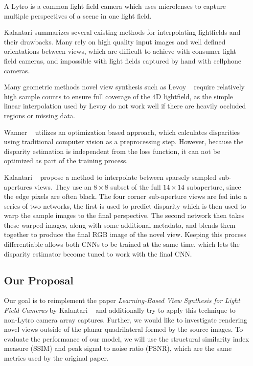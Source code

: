 \documentclass[10pt,twocolumn,letterpaper]{article}
\begin{document}
A Lytro is a common light field camera which uses microlenses to capture multiple
perspectives of a scene in one light field. 

Kalantari summarizes several existing methods for interpolating lightfields and their drawbacks.
Many rely on high quality input images and well defined orientations between views,
which are difficult to achieve with consumer light field cameras, and impossible with light fields
captured by hand with cellphone cameras.

Many geometric methods novel view synthesis 
such as Levoy \etal~\cite{levoy1996light} require relatively high sample counts to ensure full
coverage of the 4D lightfield, as the simple linear interpolation used by Levoy
do not work well if there are heavily occluded regions or missing data.

Wanner \etal~\cite{Wanner} utilizes an optimization based approach, which calculates disparities
using traditional computer vision as a preprocessing step. However, because the disparity estimation
is independent from the loss function, it can not be optimized as part of the training process. 

Kalantari \etal~\cite{LearningViewSynthesis} propose a method to interpolate between 
sparsely sampled sub-apertures views. They use an $8 \times 8$ subset of the full $14 \times 14$ subaperture, since the
edge pixels are often black. The four corner sub-aperture views are fed into a series of two 
networks, the first is used to predict disparity which is then used to warp the sample images to the final perspective.
The second network then takes these warped images, along with some additional metadata, and blends them together
to produce the final RGB image of the novel view. Keeping this process differentiable allows both CNNs to 
be trained at the same time, which lets the disparity estimator become tuned to work with the final CNN.

\subsection{Our Proposal}

Our goal is to reimplement the paper \textit{Learning-Based View Synthesis for Light Field Cameras} by 
Kalantari \etal~\cite{LearningViewSynthesis} and additionally try to apply this technique to non-Lytro camera
array captures. Further, we would like to investigate rendering novel views outside of the planar
quadrilateral formed by the source images. To evaluate the performance of our model, we will use 
the structural similarity index measure (SSIM) and peak signal to noise ratio (PSNR), which are the 
same metrics used by the original paper.
\end{document}

